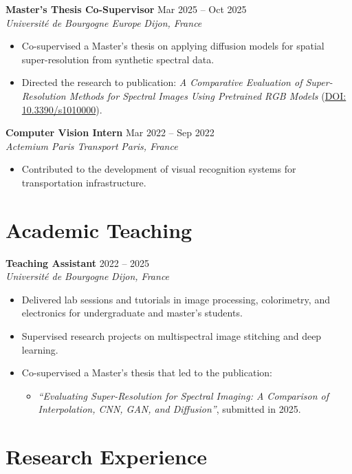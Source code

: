 \documentclass[a4paper,11pt]{article}
\newcommand{\experienceheader}[4]{
    \noindent \textbf{#1} \hfill #2 \\
    \textit{#3} \hfill \textit{#4} \vspace{2pt}
}
\begin{document}
\experienceheader{Master's Thesis Co-Supervisor}{Mar 2025 -- Oct 2025}{Université de Bourgogne Europe}{Dijon, France}
\begin{itemize}
    \item Co-supervised a Master’s thesis on applying diffusion models for spatial super-resolution from synthetic spectral data.
    \item Directed the research to publication: \textit{A Comparative Evaluation of Super-Resolution Methods for Spectral Images Using Pretrained RGB Models} (\href{https://doi.org/10.3390/s1010000}{DOI: 10.3390/s1010000}).
\end{itemize}
\vspace{12pt}

\experienceheader{Computer Vision Intern}{Mar 2022 -- Sep 2022}{Actemium Paris Transport}{Paris, France}
\begin{itemize}
    \item Contributed to the development of visual recognition systems for transportation infrastructure.
\end{itemize}


\section{Academic Teaching}


\experienceheader{Teaching Assistant}{2022 -- 2025}{Université de Bourgogne}{Dijon, France}
\begin{itemize}
    \item Delivered lab sessions and tutorials in image processing, colorimetry, and electronics for undergraduate and master's students.
    \item Supervised research projects on multispectral image stitching and deep learning.
    \item Co-supervised a Master’s thesis that led to the publication:
    \begin{itemize}
        \item \textit{“Evaluating Super-Resolution for Spectral Imaging: A Comparison of Interpolation, CNN, GAN, and Diffusion”}, submitted in 2025.
    \end{itemize}
\end{itemize}


\section{Research Experience}
\end{document}
